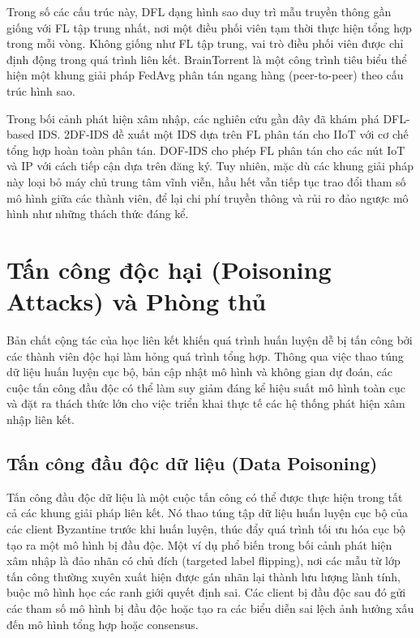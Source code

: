 Trong số các cấu trúc này, DFL dạng hình sao duy trì mẫu truyền thông gần giống với FL tập trung nhất, nơi một điều phối viên tạm thời thực hiện tổng hợp trong mỗi vòng. Không giống như FL tập trung, vai trò điều phối viên được chỉ định động trong quá trình liên kết. BrainTorrent \cite{braintorrent} là một công trình tiêu biểu thể hiện một khung giải pháp FedAvg phân tán ngang hàng (peer-to-peer) theo cấu trúc hình sao.

Trong bối cảnh phát hiện xâm nhập, các nghiên cứu gần đây đã khám phá DFL-based IDS. 2DF-IDS \cite{friha20232dfl-ids} đề xuất một IDS dựa trên FL phân tán cho IIoT với cơ chế tổng hợp hoàn toàn phân tán. DOF-IDS \cite{nakip2023dfl-ids} cho phép FL phân tán cho các nút IoT và IP với cách tiếp cận dựa trên đăng ký. Tuy nhiên, mặc dù các khung giải pháp này loại bỏ máy chủ trung tâm vĩnh viễn, hầu hết vẫn tiếp tục trao đổi tham số mô hình giữa các thành viên, để lại chi phí truyền thông và rủi ro đảo ngược mô hình như những thách thức đáng kể.

\section{Tấn công độc hại (Poisoning Attacks) và Phòng thủ}
\label{sec:poisoning}

Bản chất cộng tác của học liên kết khiến quá trình huấn luyện dễ bị tấn công bởi các thành viên độc hại làm hỏng quá trình tổng hợp. Thông qua việc thao túng dữ liệu huấn luyện cục bộ, bản cập nhật mô hình và không gian dự đoán, các cuộc tấn công đầu độc có thể làm suy giảm đáng kể hiệu suất mô hình toàn cục và đặt ra thách thức lớn cho việc triển khai thực tế các hệ thống phát hiện xâm nhập liên kết.

\subsection{Tấn công đầu độc dữ liệu (Data Poisoning)}
Tấn công đầu độc dữ liệu là một cuộc tấn công có thể được thực hiện trong tất cả các khung giải pháp liên kết. Nó thao túng tập dữ liệu huấn luyện cục bộ của các client Byzantine trước khi huấn luyện, thúc đẩy quá trình tối ưu hóa cục bộ tạo ra một mô hình bị đầu độc. Một ví dụ phổ biến trong bối cảnh phát hiện xâm nhập là đảo nhãn có chủ đích (targeted label flipping), nơi các mẫu từ lớp tấn công thường xuyên xuất hiện được gán nhãn lại thành lưu lượng lành tính, buộc mô hình học các ranh giới quyết định sai. Các client bị đầu độc sau đó gửi các tham số mô hình bị đầu độc hoặc tạo ra các biểu diễn sai lệch ảnh hưởng xấu đến mô hình tổng hợp hoặc consensus.

